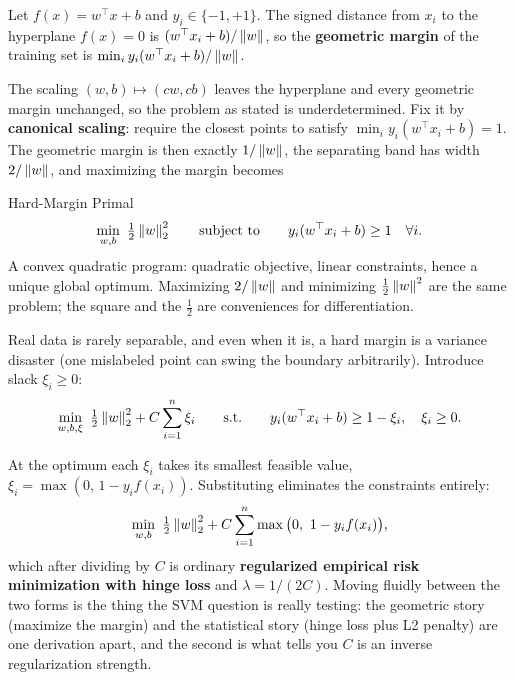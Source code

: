 Let $f(x) = w^{\top}x + b$ and $y_i \in \{-1,+1\}$. The signed distance from $x_i$ to the hyperplane $f(x)=0$ is $(w^{\top}x_i+b)/\left\lVert w\right\rVert$, so the \textbf{geometric margin} of the training set is $\min_i y_i(w^{\top}x_i+b)/\left\lVert w\right\rVert$.

The scaling $(w,b) \mapsto (cw, cb)$ leaves the hyperplane and every geometric margin unchanged, so the problem as stated is underdetermined. Fix it by \textbf{canonical scaling}: require the closest points to satisfy $\min_i y_i(w^{\top}x_i+b) = 1$. The geometric margin is then exactly $1/\left\lVert w\right\rVert$, the separating band has width $2/\left\lVert w\right\rVert$, and maximizing the margin becomes

\begin{mathresult}{Hard-Margin Primal}
\begin{equation}
\min_{w,b}\ \tfrac{1}{2}\left\lVert w\right\rVert_2^2 \qquad \text{subject to}\qquad y_i(w^{\top}x_i + b) \ge 1 \quad \forall i .
\end{equation}
A convex quadratic program: quadratic objective, linear constraints, hence a unique global optimum. Maximizing $2/\left\lVert w\right\rVert$ and minimizing $\tfrac12\left\lVert w\right\rVert^2$ are the same problem; the square and the $\tfrac12$ are conveniences for differentiation.
\end{mathresult}

Real data is rarely separable, and even when it is, a hard margin is a variance disaster (one mislabeled point can swing the boundary arbitrarily). Introduce slack $\xi_i \ge 0$:
\begin{equation}
\min_{w,b,\xi}\ \tfrac{1}{2}\left\lVert w\right\rVert_2^2 + C\sum_{i=1}^n \xi_i
\qquad\text{s.t.}\qquad y_i(w^{\top}x_i+b) \ge 1 - \xi_i, \quad \xi_i \ge 0 .
\end{equation}

\begin{keyinsight}
At the optimum each $\xi_i$ takes its smallest feasible value, $\xi_i = \max(0,\,1 - y_i f(x_i))$. Substituting eliminates the constraints entirely:
\begin{equation}
\min_{w,b}\ \tfrac{1}{2}\left\lVert w\right\rVert_2^2 + C\sum_{i=1}^n \max\big(0,\ 1 - y_i f(x_i)\big) ,
\end{equation}
which after dividing by $C$ is ordinary \textbf{regularized empirical risk minimization with hinge loss} and $\lambda = 1/(2C)$. Moving fluidly between the two forms is the thing the SVM question is really testing: the geometric story (maximize the margin) and the statistical story (hinge loss plus L2 penalty) are one derivation apart, and the second is what tells you $C$ is an inverse regularization strength.
\end{keyinsight}

